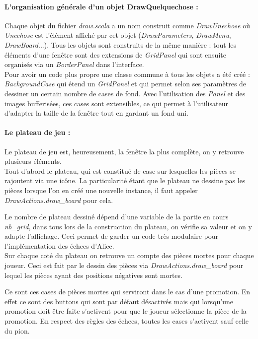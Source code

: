 \documentclass[a4paper]{article}
\begin{document}
\paragraph{L'organisation générale d'un objet DrawQuelquechose :}Chaque objet du fichier \textit{draw.scala} a un nom construit comme \textit{DrawUnechose} où \textit{Unechose} est l'élément affiché par cet objet (\textit{DrawParameters}, \textit{DrawMenu}, \textit{DrawBoard}...). Tous les objets sont construits de la même manière : tout les éléments d'une fenêtre sont des extensions de \textit{GridPanel} qui sont ensuite organisés via un \textit{BorderPanel} dans l'interface. \\

Pour avoir un code plus propre une classe commune à tous les objets a été créé : \textit{BackgroundCase} qui étend un \textit{GridPanel} et qui permet selon ses paramètres de dessiner un certain nombre de cases de fond. Avec l'utilisation des \textit{Panel} et des images bufferisées, ces cases sont extensibles, ce qui permet à l'utilisateur d'adapter la taille de la fenêtre tout en gardant un fond uni.

\paragraph{Le plateau de jeu :}Le plateau de jeu est, heureusement, la fenêtre la plus complète, on y retrouve plusieurs éléments. \\

Tout d'abord le plateau, qui est constitué de case sur lesquelles les pièces se rajoutent via une icône. La particularité étant que le plateau ne dessine pas les pièces lorsque l'on en créé une nouvelle instance, il faut appeler \textit{DrawActions.draw\_board} pour cela. 

Le nombre de plateau dessiné dépend d'une variable de la partie en cours \textit{nb\_grid}, dans tous lors de la construction du plateau, on vérifie sa valeur et on y adapte l'affichage. Ceci permet de garder un code très modulaire pour l'implémentation des échecs d'Alice. \\

Sur chaque coté du plateau on retrouve un compte des pièces mortes pour chaque joueur. Ceci est fait par le dessin des pièces via \textit{DrawActions.draw\_board} pour lequel les pièces ayant des positions négatives sont mortes.

Ce sont ces cases de pièces mortes qui serviront dans le cas d'une promotion. En effet ce sont des buttons qui sont par défaut désactivés mais qui lorsqu'une promotion doit être faite s'activent pour que le joueur sélectionne la pièce de la promotion. En respect des règles des échecs, toutes les cases s'activent sauf celle du pion. \\
\end{document}

